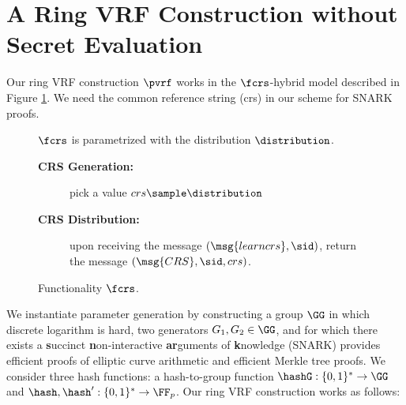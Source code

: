 \section{A Ring VRF Construction without Secret Evaluation} 
\label{sec:ringvrfconstr}
Our ring VRF construction $\pvrf$ works in the $ \fcrs $-hybrid model described in Figure \ref{f:crs}. We need the common reference string (crs) in our scheme for SNARK proofs.
\begin{figure}
	\scriptsize
	\begin{tcolorbox}
		$ \fcrs $ is parametrized with the distribution $ \distribution $.
		{  \begin{description}
				\item [\textbf{CRS Generation:}] pick a value $ crs \sample \distribution $
				\item [\textbf{CRS Distribution:}] upon receiving the message $ (\msg{learn\-crs}, \sid) $, return the message $ (\msg{CRS}, \sid, crs) $.
			\end{description}
		}
	\end{tcolorbox}
	\caption{Functionality $\fcrs$.\label{f:crs}}
\end{figure}
We instantiate parameter generation by constructing a group $\GG$ in which discrete logarithm is hard, two generators $ G_1, G_2 \in  \GG$, and for which there exists a \textbf{s}uccinct
\textbf{n}on-interactive \textbf{ar}guments of \textbf{k}nowledge (SNARK) provides efficient proofs of elliptic curve arithmetic and efficient Merkle tree proofs.  We consider three hash functions: a hash-to-group function $\hashG : \{0,1\}^* \rightarrow \GG$ and $ \hash, \hash' : \{0,1\}^* \rightarrow \FF_p $. Our ring VRF construction works as follows:


